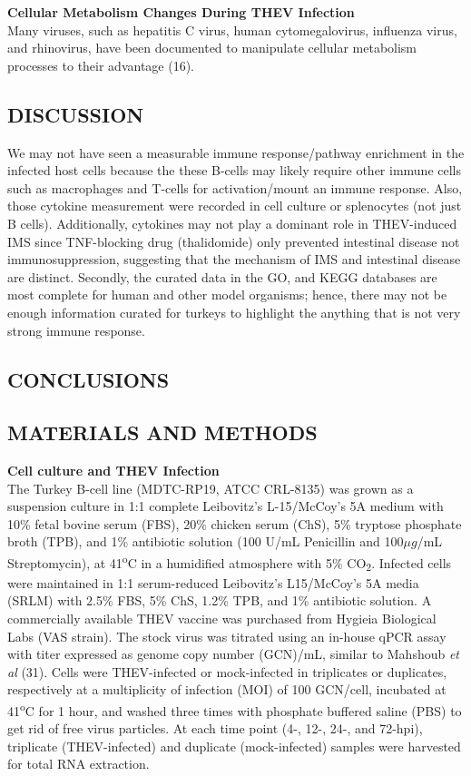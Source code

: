 \documentclass[
]{article}
\begin{document}
\textbf{Cellular Metabolism Changes During THEV Infection}\\
Many viruses, such as hepatitis C virus, human cytomegalovirus,
influenza virus, and rhinovirus, have been documented to manipulate
cellular metabolism processes to their advantage (16). \newpage

\subsection{DISCUSSION}\label{discussion}

We may not have seen a measurable immune response/pathway enrichment in
the infected host cells because the these B-cells may likely require
other immune cells such as macrophages and T-cells for activation/mount
an immune response. Also, those cytokine measurement were recorded in
cell culture or splenocytes (not just B cells). Additionally, cytokines
may not play a dominant role in THEV-induced IMS since TNF-blocking drug
(thalidomide) only prevented intestinal disease not immunosuppression,
suggesting that the mechanism of IMS and intestinal disease are
distinct. Secondly, the curated data in the GO, and KEGG databases are
most complete for human and other model organisms; hence, there may not
be enough information curated for turkeys to highlight the anything that
is not very strong immune response. \newpage

\subsection{CONCLUSIONS}\label{conclusions}

\newpage

\subsection{MATERIALS AND METHODS}\label{materials-and-methods}

\textbf{Cell culture and THEV Infection}\\
The Turkey B-cell line (MDTC-RP19, ATCC CRL-8135) was grown as a
suspension culture in 1:1 complete Leibovitz's L-15/McCoy's 5A medium
with 10\% fetal bovine serum (FBS), 20\% chicken serum (ChS), 5\%
tryptose phosphate broth (TPB), and 1\% antibiotic solution (100 U/mL
Penicillin and 100\(\mu g\)/mL Streptomycin), at 41\textsuperscript{o}C
in a humidified atmosphere with 5\% CO\textsubscript{2}. Infected cells
were maintained in 1:1 serum-reduced Leibovitz's L15/McCoy's 5A media
(SRLM) with 2.5\% FBS, 5\% ChS, 1.2\% TPB, and 1\% antibiotic solution.
A commercially available THEV vaccine was purchased from Hygieia
Biological Labs (VAS strain). The stock virus was titrated using an
in-house qPCR assay with titer expressed as genome copy number (GCN)/mL,
similar to Mahshoub \emph{et al} (31). Cells were THEV-infected or
mock-infected in triplicates or duplicates, respectively at a
multiplicity of infection (MOI) of 100 GCN/cell, incubated at
41\textsuperscript{o}C for 1 hour, and washed three times with phosphate
buffered saline (PBS) to get rid of free virus particles. At each time
point (4-, 12-, 24-, and 72-hpi), triplicate (THEV-infected) and
duplicate (mock-infected) samples were harvested for total RNA
extraction.
\end{document}
